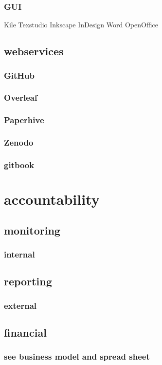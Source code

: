 \documentclass[output=guidelines,guidelines] {langscibook}
\begin{document}
\subsubsection{GUI}
                    Kile
                    Texstudio
                    Inkscape
                    InDesign
                    Word
                    OpenOffice
\subsection{webservices}
\subsubsection{GitHub}
\subsubsection{Overleaf}
\subsubsection{Paperhive}
\subsubsection{Zenodo}
\subsubsection{gitbook}
\section{accountability}
\subsection{monitoring}
\subsubsection{internal}
\subsection{reporting}
\subsubsection{external}
\subsection{financial}
\subsubsection{see business model and spread sheet}
\end{document}

